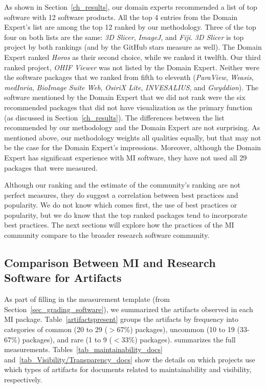 \documentclass[11pt]{article}
\begin{document}
As shown in Section~\ref{ch_results}, our domain experts recommended
a list of top software with 12 software products.  All the top 4 entries from
the Domain Expert's list are among the top 12 ranked by our methodology. Three
of the top four on both lists are the same: \textit{3D Slicer}, \textit{ImageJ},
and \textit{Fiji}. \textit{3D Slicer} is top project by both rankings (and by
the GitHub stars measure as well).  The Domain Expert ranked \textit{Horos} as
their second choice, while we ranked it twelfth.  Our third ranked project,
\textit{OHIF Viewer} was not listed by the Domain Expert.  Neither were the
software packages that we ranked from fifth to eleventh (\textit{ParaView},
\textit{Weasis}, \textit{medInria}, \textit{BioImage Suite Web}, \textit{OsiriX
Lite}, \textit{INVESALIUS}, and \textit{Gwyddion}).  The software mentioned by
the Domain Expert that we did not rank were the six recommended packages that
did not have visualization as the primary function (as discussed in
Section~\ref{ch_results}).  The differences between the list
recommended by our methodology and the Domain Expert are not surprising.  As
mentioned above, our methodology weights all qualities equally, but that may not
be the case for the Domain Expert's impressions.  Moreover, although the Domain
Expert has significant experience with MI software, they have not used all 29
packages that were measured.

Although our ranking and the estimate of the community's ranking are not perfect
measures, they do suggest a correlation between best practices and popularity.
We do not know which comes first, the use of best practices or popularity, but
we do know that the top ranked packages tend to incorporate best practices. The
next sections will explore how the practices of the MI community compare to the
broader research software community.

\subsection{Comparison Between MI and Research Software for Artifacts}
\label{Sec_CompareArtifacts}

As part of filling in the measurement template (from
Section~\ref{sec_grading_software}), we summarized the artifacts observed in
each MI package. Table~\ref{artifactspresent} groups the artifacts by frequency
into categories of common (20 to 29 ($>$67\%) packages), uncommon (10 to 19
(33-67\%) packages), and rare (1 to 9 ($<$33\%) packages). \citet{Dong2021-Data}
summarizes the full measurements.  Tables~\ref{tab_maintainability_docs}
and~\ref{tab_Visibility/Transparency_docs} show the details on which projects
use which types of artifacts for documents related to maintainability and
visibility, respectively.
\end{document}

